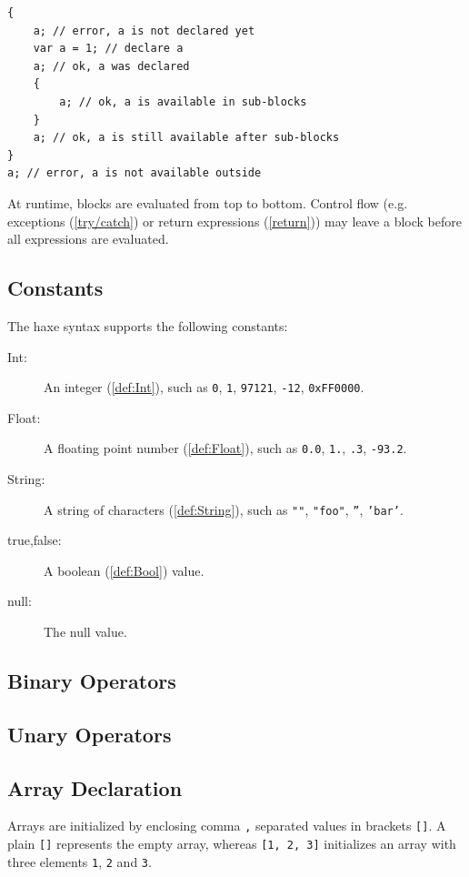 \documentclass{article}
\newcommand{\expr}[1]{\texttt{#1}}
\newcommand{\tref}[2]{#1 (\ref{#2})}
\begin{document}
\begin{lstlisting}
{
	a; // error, a is not declared yet
	var a = 1; // declare a
	a; // ok, a was declared
	{
		a; // ok, a is available in sub-blocks
	}
	a; // ok, a is still available after sub-blocks
}
a; // error, a is not available outside
\end{lstlisting}
At runtime, blocks are evaluated from top to bottom. Control flow (e.g. \tref{exceptions}{try/catch} or \tref{return expressions}{return}) may leave a block before all expressions 
are evaluated.


\subsection{Constants}
\label{Constants}

The haxe syntax supports the following constants:

\begin{description}
	\item[Int:] An \tref{integer}{def:Int}, such as \expr{0}, \expr{1}, \expr{97121}, \expr{-12}, \expr{0xFF0000}.
	\item[Float:] A \tref{floating point number}{def:Float}, such as \expr{0.0}, \expr{1.}, \expr{.3}, \expr{-93.2}.
	\item[String:] A \tref{string of characters}{def:String}, such as \expr{""}, \expr{"foo"}, \expr{''}, \expr{'bar'}.
	\item[true,false:] A \tref{boolean}{def:Bool} value.
	\item[null:] The null value.
\end{description}


\subsection{Binary Operators}

\subsection{Unary Operators}

\subsection{Array Declaration}
\label{Array Declaration}

Arrays are initialized by enclosing comma \expr{,} separated values in brackets \expr{[]}. A plain \expr{[]} represents the empty array, whereas \expr{[1, 2, 3]} initializes an array with three elements \expr{1}, \expr{2} and \expr{3}.
\end{document}
